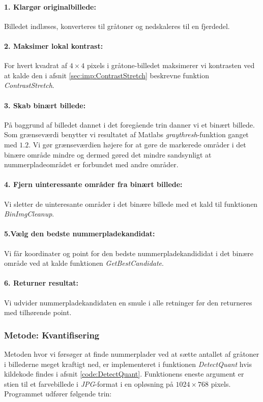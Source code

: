 \paragraph{1. Klargør originalbillede:}
Billedet indlæses, konverteres til gråtoner og nedskaleres til en fjerdedel. 

\paragraph{2. Maksimer lokal kontrast:}
For hvert kvadrat af $4 \times 4$ pixels i gråtone-billedet maksimerer vi kontrasten ved at kalde den i afsnit \vref{sec:imp:ContrastStretch} beskrevne funktion \textit{ContrastStretch}.

\paragraph{3. Skab binært billede:}
På baggrund af billedet dannet i det foregående trin danner vi et binært billede. Som grænseværdi benytter vi resultatet af Matlabs \textit{graythresh}-funktion ganget med $1.2$. Vi gør grænseværdien højere for at gøre de markerede områder i det binære område mindre og dermed gøred det mindre sandsynligt at nummerpladeområdet er forbundet med andre områder.

\paragraph{4. Fjern uinteressante områder fra binært billede:}
Vi sletter de uinteresante områder i det binære billede med et kald til funktionen \textit{BinImgCleanup}.

\paragraph{5.Vælg den bedste nummerpladekandidat:}
Vi får koordinater og point for den bedste nummerpladekandididat i det binære område ved at kalde funktionen \textit{GetBestCandidate}. 

\paragraph{6. Returner resultat:}
Vi udvider nummerpladekandidaten en smule i alle retninger før den returneres med tilhørende point.

\subsubsection{Metode: Kvantifisering}
Metoden hvor vi førsøger at finde nummerplader ved at sætte antallet af gråtoner i billederne meget kraftigt ned, er implementeret i funktionen \textit{DetectQuant} hvis kildekode findes i afsnit \vref{code:DetectQuant}. Funktionens eneste argument er stien til et farvebillede i \textit{JPG}-format i en opløsning på $1024 \times 768$ pixels. Programmet udfører følgende trin:

